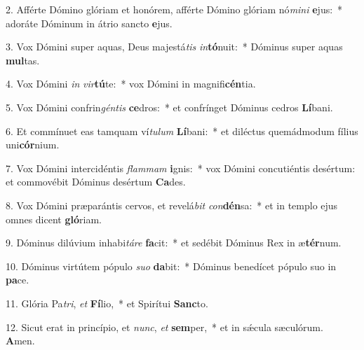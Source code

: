 2. Afférte Dómino glóriam et honórem, afférte Dómino glóriam nó\textit{mi}\textit{ni} \textbf{e}jus:~*  adoráte Dóminum in átrio sancto \textbf{e}jus.\

3. Vox Dómini super aquas, Deus majestá\textit{tis} \textit{in}\textbf{tó}nuit:~*  Dóminus super aquas \textbf{mul}tas.\

4. Vox Dómini \textit{in} \textit{vir}\textbf{tú}te:~*  vox Dómini in magnifi\textbf{cén}tia.\

5. Vox Dómini confrin\textit{gén}\textit{tis} \textbf{ce}dros:~*  et confrínget Dóminus cedros \textbf{Lí}bani.\

6. Et commínuet eas tamquam ví\textit{tu}\textit{lum} \textbf{Lí}bani:~*  et diléctus quemádmodum fílius uni\textbf{cór}nium.\

7. Vox Dómini intercidéntis \textit{flam}\textit{mam} \textbf{i}gnis:~*  vox Dómini concutiéntis desértum: et commovébit Dóminus desértum \textbf{Ca}des.\

8. Vox Dómini præparántis cervos, et revelá\textit{bit} \textit{con}\textbf{dén}sa:~*  et in templo ejus omnes dicent \textbf{gló}riam.\

9. Dóminus dilúvium inhabi\textit{tá}\textit{re} \textbf{fa}cit:~*  et sedébit Dóminus Rex in æ\textbf{tér}num.\

10. Dóminus virtútem pópulo \textit{su}\textit{o} \textbf{da}bit:~*  Dóminus benedícet pópulo suo in \textbf{pa}ce.\

11. Glória Pa\textit{tri}, \textit{et} \textbf{Fí}lio,~*  et Spirítui \textbf{Sanc}to.\

12. Sicut erat in princípio, et \textit{nunc}, \textit{et} \textbf{sem}per,~*  et in sǽcula sæculórum. \textbf{A}men.\

